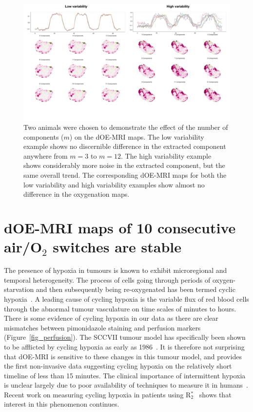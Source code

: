 \begin{figure}[htbp]
   \centering
   \includegraphics[width=\textwidth]{futurework/futurework-images/technical_numComponents.pdf} %
   \caption{Two animals were chosen to demonstrate the effect of the number of components ($m$) on the \acs{dOE-MRI} maps. The low variability example shows no discernible difference in the extracted component anywhere from $m=3$ to $m=12$. The high variability example shows considerably more noise in the extracted component, but the same overall trend. The corresponding \acs{dOE-MRI} maps for both the low variability and high variability examples show almost no difference in the oxygenation maps.}
   \label{numComponents}
\end{figure}

\section{dOE-MRI maps of 10 consecutive air/\texorpdfstring{O$_2$}{O2} switches are stable}

The presence of hypoxia in tumours is known to exhibit microregional and temporal heterogeneity.
The process of cells going through periods of oxygen-starvation and then subsequently being re-oxygenated has been termed cyclic hypoxia~\cite{Dewhirst:2009de,Bayer:2011js, Bayer:2012kb}.
A leading cause of cycling hypoxia is the variable flux of red blood cells through the abnormal tumour vasculature on time scales of minutes to hours.
There is some evidence of cycling hypoxia in our data as there are clear mismatches between pimonidazole staining and perfusion markers (Figure~\ref{fig_perfusion}).
The SCCVII tumour model has specifically been shown to be afflicted by cycling hypoxia as early as  1986~\cite{Chaplin:1986iz}.
It is therefore not surprising that \acs{dOE-MRI} is sensitive to these changes in this tumour model, and provides the first non-invasive data suggesting cycling hypoxia on the relatively short timeline of less than 15 minutes.
The clinical importance of intermittent hypoxia is unclear largely due to poor availability of techniques to measure it in humans~\cite{Michiels:2016hv}. 
Recent work on measuring cycling hypoxia in patients using R$_2^*$~\cite{Panek:2017ge} shows that interest in this phenomenon continues.

